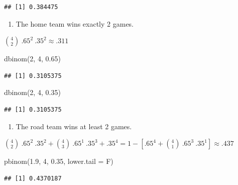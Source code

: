 \documentclass[
  11pt,
]{book}
\newenvironment{Shaded}{\begin{snugshade}}{\end{snugshade}}
\newcommand{\AttributeTok}[1]{\textcolor[rgb]{0.77,0.63,0.00}{#1}}
\newcommand{\DecValTok}[1]{\textcolor[rgb]{0.00,0.00,0.81}{#1}}
\newcommand{\FloatTok}[1]{\textcolor[rgb]{0.00,0.00,0.81}{#1}}
\newcommand{\FunctionTok}[1]{\textcolor[rgb]{0.00,0.00,0.00}{#1}}
\newcommand{\NormalTok}[1]{#1}
\providecommand{\tightlist}{%
  \setlength{\itemsep}{0pt}\setlength{\parskip}{0pt}}
\theoremstyle{definition}
\theoremstyle{definition}
\theoremstyle{definition}
\theoremstyle{definition}
\theoremstyle{remark}
\begin{document}
\begin{verbatim}
## [1] 0.384475
\end{verbatim}

\begin{enumerate}
\def\labelenumi{(\alph{enumi})}
\setcounter{enumi}{1}
\tightlist
\item
  The home team wins exactly 2 games.
\end{enumerate}

\(\binom{4}{2}\ .65^2\ .35^2 \approx .311\)

\begin{Shaded}
\begin{Highlighting}[]
\FunctionTok{dbinom}\NormalTok{(}\DecValTok{2}\NormalTok{, }\DecValTok{4}\NormalTok{, }\FloatTok{0.65}\NormalTok{)}
\end{Highlighting}
\end{Shaded}

\begin{verbatim}
## [1] 0.3105375
\end{verbatim}

\begin{Shaded}
\begin{Highlighting}[]
\FunctionTok{dbinom}\NormalTok{(}\DecValTok{2}\NormalTok{, }\DecValTok{4}\NormalTok{, }\FloatTok{0.35}\NormalTok{)}
\end{Highlighting}
\end{Shaded}

\begin{verbatim}
## [1] 0.3105375
\end{verbatim}

\begin{enumerate}
\def\labelenumi{(\alph{enumi})}
\setcounter{enumi}{2}
\tightlist
\item
  The road team wins at least 2 games.
\end{enumerate}

\(\binom{4}{2}\ .65^2\ .35^2 + \binom{4}{3}\ .65^1\ .35^3 + .35^4 = 1 - [.65^4 + \binom{4}{1}\ .65^3\ .35^1] \approx .437\)

\begin{Shaded}
\begin{Highlighting}[]
\FunctionTok{pbinom}\NormalTok{(}\FloatTok{1.9}\NormalTok{, }\DecValTok{4}\NormalTok{, }\FloatTok{0.35}\NormalTok{, }\AttributeTok{lower.tail =}\NormalTok{ F)}
\end{Highlighting}
\end{Shaded}

\begin{verbatim}
## [1] 0.4370187
\end{verbatim}
\end{document}
